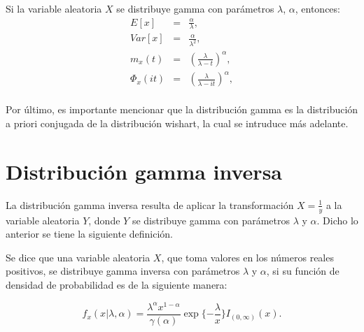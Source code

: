 Si la variable aleatoria $X$ se distribuye gamma con parámetros $\lambda$, $\alpha$, entonces:
\begin{eqnarray}
	E[x]&=&\frac{\alpha}{\lambda}, \nonumber\\
	Var[x]&=&\frac{\alpha}{\lambda^{2}}, \nonumber\\
	m_{x}(t)&=&(\frac{\lambda}{\lambda-t})^{\alpha},\nonumber\\
	\Phi_{x}(it)&=&(\frac{\lambda}{\lambda-it})^{\alpha}, \nonumber\\
\end{eqnarray}

Por último, es importante mencionar que la distribución gamma es la distribución a priori conjugada de la distribución wishart, la cual se intruduce más adelante.

\section{Distribución gamma inversa}

La distribución gamma inversa resulta de aplicar la transformación $X=\frac{1}{y}$ a la variable aleatoria $Y$, donde $Y$ se distribuye gamma con parámetros $\lambda$ y $\alpha$. Dicho lo anterior se tiene la siguiente definición.

Se dice que una variable aleatoria $X$, que toma valores en los números reales positivos, se distribuye gamma inversa con parámetros $\lambda$ y $\alpha$, si su función de densidad de probabilidad es de la siguiente manera:

\begin{equation}
	f_{x}(x|\lambda, \alpha)=\frac{\lambda^{\alpha}x^{1-\alpha}}{\gamma(\alpha)}\exp\{-\frac{\lambda}{x}\}I_{(0,\infty)}(x).
\end{equation}

